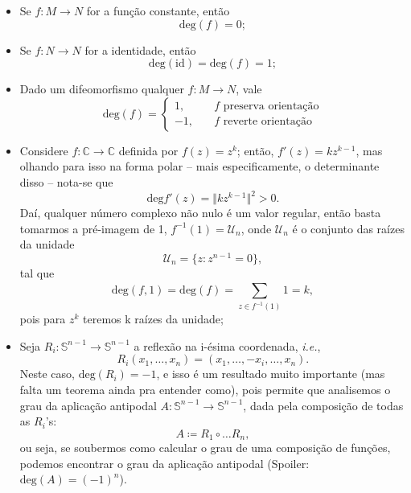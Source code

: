 \documentclass[../differential_topology.tex]{subfiles}
\begin{document}
\begin{example}
	\begin{itemize}
		\item[1)] Se \(f:M\rightarrow N\) for a função constante, então
		      \[
			      \mathrm{deg}(f) = 0;
		      \]
		\item[2)] Se \(f:N\rightarrow N\) for a identidade, então
		      \[
			      \mathrm{deg}(\mathrm{id}) = \mathrm{deg}(f) = 1;
		      \]
		\item[3)] Dado um difeomorfismo qualquer \(f:M\rightarrow N\), vale
		      \[
			      \mathrm{deg}(f)  = \left\{\begin{array}{ll}
				      1, \quad  & f\text{ preserva orientação} \\
				      -1, \quad & f \text{ reverte orientação}
			      \end{array}\right.
		      \]
		\item[4)] Considere \(f:\mathbb{C}\rightarrow \mathbb{C}\) definida por \(f(z) = z^{k}\); então, \(f'(z) = k z^{k-1}\), mas olhando para isso na forma polar -- mais especificamente, o determinante disso -- nota-se que
		      \[
			      \mathrm{deg}f'(z) = \Vert kz^{k-1} \Vert^{2} > 0.
		      \]
		      Daí, qualquer número complexo não nulo é um valor regular, então basta tomarmos a pré-imagem de 1, \(f^{-1}(1) = \mathcal{U}_{n}\), onde \(\mathcal{U}_{n}\) é o conjunto das raízes da unidade
		      \[
			      \mathcal{U}_{n} = \{z: z^{n-1} = 0\},
		      \]
		      tal que
		      \[
			      \mathrm{deg}(f, 1) = \mathrm{deg}(f) =\sum\limits_{z\in f^{-1}(1)}^{}1 = k,
		      \]
		      pois para \(z^{k}\) teremos k raízes da unidade;
		\item[5)] Seja \(R_{i}:\mathbb{S}^{n-1}\rightarrow \mathbb{S}^{n-1}\) a reflexão na i-ésima coordenada, \textit{i.e.},
		      \[
			      R_{i}(x_1, \dotsc , x_{n}) = (x_1, \dotsc ,-x_{i}, \dotsc , x_{n}).
		      \]
		      Neste caso, \(\mathrm{deg}(R_{i}) = -1\), e isso é um resultado muito importante (mas falta um teorema ainda pra entender como), pois permite que analisemos o grau da aplicação antipodal \(A:\mathbb{S}^{n-1}\rightarrow \mathbb{S}^{n-1}\), dada pela composição de todas as \(R_{i}\)'s:
		      \[
			      A \coloneqq R_1\circ \dotsc R_{n},
		      \]
		      ou seja, se soubermos como calcular o grau de uma composição de funções, podemos encontrar o grau da aplicação antipodal (Spoiler: \(\mathrm{deg}(A) = (-1)^{n}\)).
	\end{itemize}
\end{example}
\end{document}
